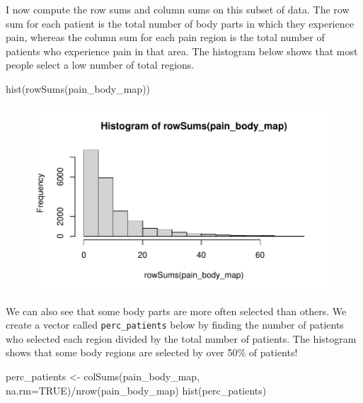 \documentclass[
  letterpaper,
]{krantz}
\makeatletter
\newenvironment{Shaded}{\begin{snugshade}}{\end{snugshade}}
\newcommand{\AttributeTok}[1]{\textcolor[rgb]{0.40,0.45,0.13}{#1}}
\newcommand{\ConstantTok}[1]{\textcolor[rgb]{0.56,0.35,0.01}{#1}}
\newcommand{\FunctionTok}[1]{\textcolor[rgb]{0.28,0.35,0.67}{#1}}
\newcommand{\NormalTok}[1]{\textcolor[rgb]{0.00,0.23,0.31}{#1}}
\newcommand{\OtherTok}[1]{\textcolor[rgb]{0.00,0.23,0.31}{#1}}
\newcommand{\SpecialCharTok}[1]{\textcolor[rgb]{0.37,0.37,0.37}{#1}}
\newenvironment{kframe}{%
\medskip{}
\setlength{\fboxsep}{.8em}
 \def\at@end@of@kframe{}%
 \ifinner\ifhmode%
  \def\at@end@of@kframe{\end{minipage}}%
  \begin{minipage}{\columnwidth}%
 \fi\fi%
 \def\FrameCommand##1{\hskip\@totalleftmargin \hskip-\fboxsep
 \colorbox{shadecolor}{##1}\hskip-\fboxsep
     \hskip-\linewidth \hskip-\@totalleftmargin \hskip\columnwidth}%
 \MakeFramed {\advance\hsize-\width
   \@totalleftmargin\z@ \linewidth\hsize
   \@setminipage}}%
 {\par\unskip\endMakeFramed%
 \at@end@of@kframe}
\renewenvironment{Shaded}{\begin{kframe}}{\end{kframe}}
\makeatother
\begin{document}
I now compute the row sums and column sums on this subset of data. The
row sum for each patient is the total number of body parts in which they
experience pain, whereas the column sum for each pain region is the
total number of patients who experience pain in that area. The histogram
below shows that most people select a low number of total regions.

\begin{Shaded}
\begin{Highlighting}[]
\FunctionTok{hist}\NormalTok{(}\FunctionTok{rowSums}\NormalTok{(pain\_body\_map))}
\end{Highlighting}
\end{Shaded}

\begin{figure}[H]

{\centering \includegraphics[width=1\textwidth,height=\textheight]{book/3_data_files_files/figure-pdf/unnamed-chunk-20-1.pdf}

}

\end{figure}

We can also see that some body parts are more often selected than
others. We create a vector called \texttt{perc\_patients} below by
finding the number of patients who selected each region divided by the
total number of patients. The histogram shows that some body regions are
selected by over 50\% of patients!

\begin{Shaded}
\begin{Highlighting}[]
\NormalTok{perc\_patients }\OtherTok{\textless{}{-}} \FunctionTok{colSums}\NormalTok{(pain\_body\_map, }\AttributeTok{na.rm=}\ConstantTok{TRUE}\NormalTok{)}\SpecialCharTok{/}\FunctionTok{nrow}\NormalTok{(pain\_body\_map)}
\FunctionTok{hist}\NormalTok{(perc\_patients)}
\end{Highlighting}
\end{Shaded}
\end{document}
